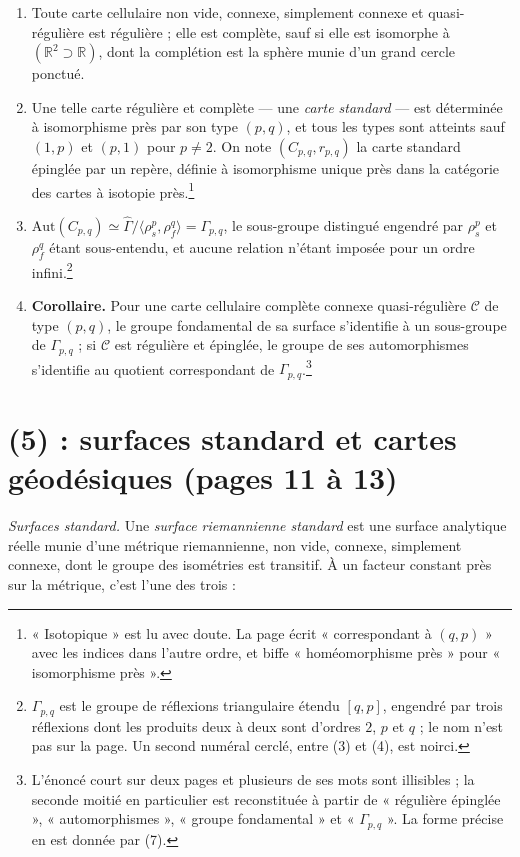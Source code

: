 \documentclass[11pt,a4paper]{article}
\begin{document}
\begin{enumerate}
\item[(1)] Toute carte cellulaire non vide, connexe, simplement connexe et
quasi-régulière est régulière ; elle est complète, sauf si elle est isomorphe
à $(\mathbb{R}^{2} \supset \mathbb{R})$, dont la complétion est la sphère munie
d'un grand cercle ponctué.
\item[(2)] Une telle carte régulière et complète --- une \emph{carte
standard} --- est déterminée à isomorphisme près par son type $(p, q)$, et
tous les types sont atteints sauf $(1, p)$ et $(p, 1)$ pour $p \neq 2$. On
note $(C_{p,q}, r_{p,q})$ la carte standard épinglée par un repère, définie à
isomorphisme unique près dans la catégorie des cartes à isotopie
près.\footnote{« Isotopique » est lu avec doute. La page écrit « correspondant à
$(q,p)$ » avec les indices dans l'autre ordre, et biffe « homéomorphisme près »
pour « isomorphisme près ».}
\item[(3)] $\mathrm{Aut}(C_{p,q}) \simeq \widehat{\Gamma}/\langle \rho_{s}^{p},
\rho_{f}^{q} \rangle = \Gamma_{p,q}$, le sous-groupe distingué engendré par
$\rho_{s}^{p}$ et $\rho_{f}^{q}$ étant sous-entendu, et aucune relation n'étant
imposée pour un ordre infini.\footnote{$\Gamma_{p,q}$ est le groupe de
réflexions triangulaire étendu $[q, p]$, engendré par trois réflexions dont
les produits deux à deux sont d'ordres $2$, $p$ et $q$ ; le nom n'est pas sur la
page. Un second numéral cerclé, entre (3) et (4), est noirci.}
\item[(4)] \textbf{Corollaire.} Pour une carte cellulaire complète connexe
quasi-régulière $\mathcal{C}$ de type $(p,q)$, le groupe fondamental de sa
surface s'identifie à un sous-groupe de $\Gamma_{p,q}$ ; si $\mathcal{C}$ est
régulière et épinglée, le groupe de ses automorphismes s'identifie au quotient
correspondant de $\Gamma_{p,q}$.\footnote{L'énoncé court sur deux pages et
plusieurs de ses mots sont illisibles ; la seconde moitié en particulier est
reconstituée à partir de « régulière épinglée », « automorphismes », « groupe
fondamental » et « $\Gamma_{p,q}$ ». La forme précise en est donnée par (7).}
\end{enumerate}

\section*{(5) : surfaces standard et cartes géodésiques (pages 11 à 13)}

\emph{Surfaces standard.} Une \emph{surface riemannienne standard} est une
surface analytique réelle munie d'une métrique riemannienne, non vide,
connexe, simplement connexe, dont le groupe des isométries est transitif. À un
facteur constant près sur la métrique, c'est l'une des trois :
\end{document}
